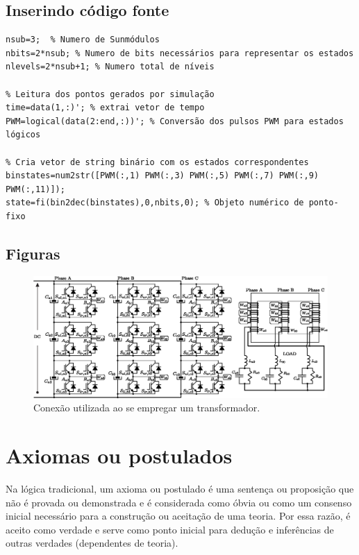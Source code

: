 \subsection{Inserindo código fonte}

\begin{lstlisting}[caption={Leitura dos dados simulados e conversão para estados topológicos.},label={lst:leituradadossim}]
% Pré definições iniciais
nsub=3;  % Numero de Sunmódulos
nbits=2*nsub; % Numero de bits necessários para representar os estados
nlevels=2*nsub+1; % Numero total de níveis

% Leitura dos pontos gerados por simulação
time=data(1,:)'; % extrai vetor de tempo
PWM=logical(data(2:end,:))'; % Conversão dos pulsos PWM para estados lógicos

% Cria vetor de string binário com os estados correspondentes
binstates=num2str([PWM(:,1) PWM(:,3) PWM(:,5) PWM(:,7) PWM(:,9) PWM(:,11)]);
state=fi(bin2dec(binstates),0,nbits,0); % Objeto numérico de ponto-fixo
\end{lstlisting}

\subsection{Figuras}



\begin{figure}[!h]
	\centering
	\includegraphics[width=1\linewidth]{figs/InversorTransformador}
	\caption{Conexão utilizada ao se empregar um transformador.}
	\label{fig:InversorTransformador}
\end{figure}

\clearpage
\section{Axiomas ou postulados}

Na lógica tradicional, um axioma ou postulado é uma sentença ou proposição que não é provada ou demonstrada e é considerada como óbvia ou como um consenso inicial necessário para a construção ou aceitação de uma teoria. Por essa razão, é aceito como verdade e serve como ponto inicial para dedução e inferências de outras verdades (dependentes de teoria).


